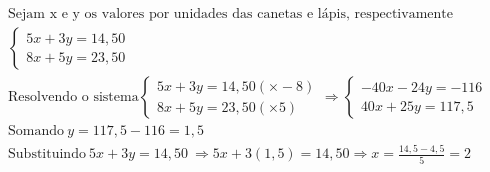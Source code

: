 \begin{eqnarray*}
		\text{Sejam x e y os valores por unidades das canetas e lápis, respectivamente}\\
		\begin{cases}
				5x+3y=14,50\\
				8x+5y=23,50
		\end{cases}\\
		\text{Resolvendo o sistema}
		\begin{cases}
				5x+3y=14,50 (\times -8)\\
				8x+5y=23,50 (\times 5)
		\end{cases}
		\Rightarrow
		\begin{cases}
				-40x-24y=-116\\
				40x+25y=117,5
		\end{cases}\\
		\text{Somando}\  
		y=117,5-116 =1,5\\
		\text{Substituindo}\ 
		5x+3y=14,50\ \Rightarrow 5x+3(1,5)=14,50 \Rightarrow x =\frac{14,5-4,5}{5}=2
\end{eqnarray*}
